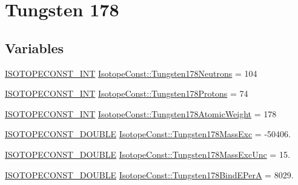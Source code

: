\hypertarget{group___isotope_const-_tungsten-_w178}{}\section{Tungsten 178}
\label{group___isotope_const-_tungsten-_w178}
\subsection*{Variables}
\begin{DoxyCompactItemize}
\item 
\mbox{\hyperlink{group___isotope_const-_macros_ga5f18360b3e99483a35c32d789e62621c}{I\+S\+O\+T\+O\+P\+E\+C\+O\+N\+S\+T\+\_\+\+I\+NT}} \mbox{\hyperlink{group___isotope_const-_tungsten-_w178_ga31f1e8f4652249358437394f2bfd1698}{Isotope\+Const\+::\+Tungsten178\+Neutrons}} = 104
\item 
\mbox{\hyperlink{group___isotope_const-_macros_ga5f18360b3e99483a35c32d789e62621c}{I\+S\+O\+T\+O\+P\+E\+C\+O\+N\+S\+T\+\_\+\+I\+NT}} \mbox{\hyperlink{group___isotope_const-_tungsten-_w178_ga1f03f9db61389e50bf69f8da8ae982c8}{Isotope\+Const\+::\+Tungsten178\+Protons}} = 74
\item 
\mbox{\hyperlink{group___isotope_const-_macros_ga5f18360b3e99483a35c32d789e62621c}{I\+S\+O\+T\+O\+P\+E\+C\+O\+N\+S\+T\+\_\+\+I\+NT}} \mbox{\hyperlink{group___isotope_const-_tungsten-_w178_gaf675c13e8b82ff3756a4a23ee96bb0d5}{Isotope\+Const\+::\+Tungsten178\+Atomic\+Weight}} = 178
\item 
\mbox{\hyperlink{group___isotope_const-_macros_ga8f45a7272ce02c0b4c65c44636ed719a}{I\+S\+O\+T\+O\+P\+E\+C\+O\+N\+S\+T\+\_\+\+D\+O\+U\+B\+LE}} \mbox{\hyperlink{group___isotope_const-_tungsten-_w178_ga982bf5108d395609f954b84cf919209c}{Isotope\+Const\+::\+Tungsten178\+Mass\+Exc}} = -\/50406.
\item 
\mbox{\hyperlink{group___isotope_const-_macros_ga8f45a7272ce02c0b4c65c44636ed719a}{I\+S\+O\+T\+O\+P\+E\+C\+O\+N\+S\+T\+\_\+\+D\+O\+U\+B\+LE}} \mbox{\hyperlink{group___isotope_const-_tungsten-_w178_gadaf147d3bbeb64a2a75bfc92f69eaa0e}{Isotope\+Const\+::\+Tungsten178\+Mass\+Exc\+Unc}} = 15.
\item 
\mbox{\hyperlink{group___isotope_const-_macros_ga8f45a7272ce02c0b4c65c44636ed719a}{I\+S\+O\+T\+O\+P\+E\+C\+O\+N\+S\+T\+\_\+\+D\+O\+U\+B\+LE}} \mbox{\hyperlink{group___isotope_const-_tungsten-_w178_gac4849ddeaf22d18870428a8e784e3b5d}{Isotope\+Const\+::\+Tungsten178\+Bind\+E\+PerA}} = 8029.
\item 

\end{DoxyCompactItemize}
